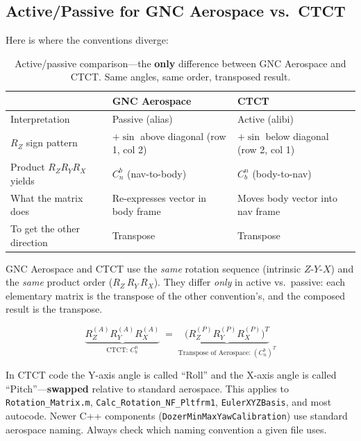 \documentclass[12pt,a4paper]{article}
\begin{document}
\subsection{Active/Passive for GNC Aerospace vs.\ CTCT}

Here is where the conventions diverge:

\begin{table}[h]
\centering
\begin{tabular}{@{}p{3.8cm}p{5cm}p{5cm}@{}}
\toprule
 & \textbf{GNC Aerospace} & \textbf{CTCT} \\
\midrule
Interpretation &
  Passive (alias) &
  Active (alibi) \\
$R_Z$ sign pattern &
  $+\sin$ above diagonal (row 1, col 2) &
  $+\sin$ below diagonal (row 2, col 1) \\
Product $R_Z R_Y R_X$ yields &
  $C_n^b$ (nav-to-body) &
  $C_b^n$ (body-to-nav) \\
What the matrix does &
  Re-expresses vector in body frame &
  Moves body vector into nav frame \\
To get the other direction &
  Transpose &
  Transpose \\
\bottomrule
\end{tabular}
\caption{Active/passive comparison---the \textbf{only} difference between
GNC Aerospace and CTCT.  Same angles, same order, transposed result.}
\end{table}

\begin{keybox}[Summary]
GNC Aerospace and CTCT use the \emph{same} rotation sequence (intrinsic
$Z$-$Y$-$X$) and the \emph{same} product order ($R_Z\,R_Y\,R_X$).
They differ \emph{only} in active vs.\ passive: each elementary matrix
is the transpose of the other convention's, and the composed result is
the transpose.

\[
  \underbrace{R_Z^{(A)} R_Y^{(A)} R_X^{(A)}}_{\text{CTCT: }C_b^n}
  \;=\;
  \underbrace{\bigl(R_Z^{(P)} R_Y^{(P)} R_X^{(P)}\bigr)^T}_{\text{Transpose of Aerospace: }(C_n^b)^T}
\]
\end{keybox}

\begin{warningbox}
In CTCT code the Y-axis angle is called ``Roll'' and the X-axis angle
is called ``Pitch''---\textbf{swapped} relative to standard aerospace.
This applies to \texttt{Rotation\_Matrix.m},
\texttt{Calc\_Rotation\_NF\_Pltfrm1}, \texttt{EulerXYZBasis}, and most
autocode.  Newer C++ components (\texttt{DozerMinMaxYawCalibration})
use standard aerospace naming.  Always check which naming convention
a given file uses.
\end{warningbox}
\end{document}
